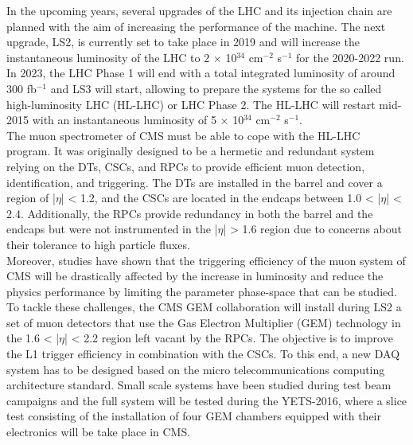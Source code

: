 
In the upcoming years, several upgrades of the LHC and its injection chain are planned with the aim of increasing the performance of the machine. The next upgrade, LS2, is currently set to take place in 2019 and will increase the instantaneous luminosity of the LHC to 2 $ \times $ 10$^{34}$ cm$^{-2}$ s$^{-1}$ for the 2020-2022 run. In 2023, the LHC Phase 1 will end with a total integrated luminosity of around 300 fb$^{-1}$ and LS3 will start, allowing to prepare the systems for the so called high-luminosity LHC (HL-LHC) or LHC Phase 2. The HL-LHC will restart mid-2015 with an instantaneous luminosity of 5 $ \times $ 10$^{34}$ cm$^{-2}$ s$^{-1}$. \\

The muon spectrometer of CMS must be able to cope with the HL-LHC program. It was originally designed to be a hermetic and redundant system relying on the DTs, CSCs, and RPCs to provide efficient muon detection, identification, and triggering. The DTs are installed in the barrel and cover a region of |$\eta$| < 1.2, and the CSCs are located in the endcaps between 1.0 < |$\eta$| < 2.4. Additionally, the RPCs provide redundancy in both the barrel and the endcaps but were not instrumented in the |$\eta$| > 1.6 region due to concerns about their tolerance to high particle fluxes. \\

Moreover, studies have shown that the triggering efficiency of the muon system of CMS will be drastically affected by the increase in luminosity and reduce the physics performance by limiting the parameter phase-space that can be studied. \\

To tackle these challenges, the CMS GEM collaboration \cite{Colaleo:2021453} will install during LS2 a set of muon detectors that use the Gas Electron Multiplier (GEM) technology in the 1.6 < |$\eta$| < 2.2 region left vacant by the RPCs. The objective is to improve the L1 trigger efficiency in combination with the CSCs. To this end, a new DAQ system has to be designed based on the micro telecommunications computing architecture standard. Small scale systems have been studied during test beam campaigns and the full system will be tested during the YETS-2016, where a slice test consisting of the installation of four GEM chambers equipped with their electronics will be take place in CMS. \\

